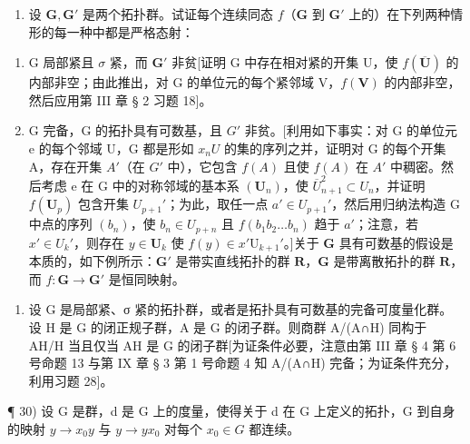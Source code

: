 \begin{enumerate}
\def\labelenumi{\arabic{enumi})}
\setcounter{enumi}{27}
\tightlist
\item
  设 \(\mathbf{G}, \mathbf{G}'\) 是两个拓扑群。试证每个连续同态 \(f\)（\(\mathbf{G}\) 到 \(\mathbf{G}'\) 上的）在下列两种情形的每一种中都是严格态射：
\end{enumerate}

\begin{enumerate}
\def\labelenumi{\alph{enumi})}
\item
  G 局部紧且 \(\sigma\) 紧，而 \(\mathbf{G}'\) 非贫{[}证明 G 中存在相对紧的开集 U，使 \(f(\overline{\mathbf{U}})\) 的内部非空；由此推出，对 G 的单位元的每个紧邻域 V，\(f(\mathbf{V})\) 的内部非空，然后应用第 III 章 § 2 习题 18{]}。
\item
  G 完备，G 的拓扑具有可数基，且 \(G'\) 非贫。{[}利用如下事实：对 G 的单位元 e 的每个邻域 U，G 都是形如 \(x_{n}U\) 的集的序列之并，证明对 G 的每个开集 A，存在开集 \(A'\)（在 \(G'\) 中），它包含 \(f(A)\) 且使 \(f(A)\) 在 \(A'\) 中稠密。然后考虑 e 在 G 中的对称邻域的基本系 \((\mathbf{U}_{n})\)，使 \(\overline{U}_{n+1}^{2} \subset U_{n}\)，并证明 \(f(\mathbf{U}_{p})\) 包含开集 \(U_{p+1}'\)；为此，取任一点 \(a' \in U_{p+1}'\)，然后用归纳法构造 G 中点的序列 \((b_{n})\)，使 \(b_{n} \in U_{p+n}\) 且 \(f(b_{1}b_{2}\ldots b_{n})\) 趋于 \(a'\)；注意，若 \(x' \in U_{k}'\)，则存在 \(y \in \mathbf{U}_k\) 使 \(f(y) \in x' \mathrm{U}_{k+1}'\)。{]}关于 \(\mathbf{G}\) 具有可数基的假设是本质的，如下例所示：\(\mathbf{G}'\) 是带实直线拓扑的群 \(\mathbf{R}\)，\(\mathbf{G}\) 是带离散拓扑的群 \(\mathbf{R}\)，而 \(f: \mathbf{G} \to \mathbf{G}'\) 是恒同映射。
\end{enumerate}

\begin{enumerate}
\def\labelenumi{\arabic{enumi})}
\setcounter{enumi}{28}
\tightlist
\item
  设 G 是局部紧、σ 紧的拓扑群，或者是拓扑具有可数基的完备可度量化群。设 H 是 G 的闭正规子群，A 是 G 的闭子群。则商群 A/(A∩H) 同构于 AH/H 当且仅当 AH 是 G 的闭子群{[}为证条件必要，注意由第 III 章 § 4 第 6 号命题 13 与第 IX 章 § 3 第 1 号命题 4 知 A/(A∩H) 完备；为证条件充分，利用习题 28{]}。
\end{enumerate}

¶ 30) 设 G 是群，d 是 G 上的度量，使得关于 d 在 G 上定义的拓扑，G 到自身的映射 \(y \to x_{0}y\) 与 \(y \to yx_{0}\) 对每个 \(x_{0} \in G\) 都连续。

